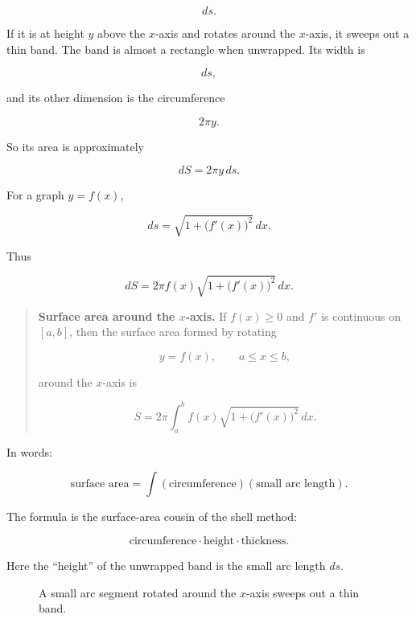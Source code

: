\[
ds.
\]

If it is at height \(y\) above the \(x\)-axis and rotates around the \(x\)-axis, it sweeps
out a thin band.  The band is almost a rectangle when unwrapped.  Its width is

\[
ds,
\]

and its other dimension is the circumference

\[
2\pi y.
\]

So its area is approximately

\[
dS=2\pi y\,ds.
\]

For a graph \(y=f(x)\),

\[
ds=\sqrt{1+\bigl(f'(x)\bigr)^2}\,dx.
\]

Thus

\[
dS
=
2\pi f(x)\sqrt{1+\bigl(f'(x)\bigr)^2}\,dx.
\]

\begin{quote}
\textbf{Surface area around the \(x\)-axis.}
If \(f(x)\ge0\) and \(f'\) is continuous on \([a,b]\), then the surface area formed by
rotating

\[
y=f(x),
\qquad a\le x\le b,
\]

around the \(x\)-axis is

\[
\boxed{
S=2\pi\int_a^b f(x)\sqrt{1+\bigl(f'(x)\bigr)^2}\,dx.
}
\]
\end{quote}

In words:

\[
\boxed{
\text{surface area}
=
\int(\text{circumference})(\text{small arc length}).
}
\]

The formula is the surface-area cousin of the shell method:

\[
\text{circumference}\cdot\text{height}\cdot\text{thickness}.
\]

Here the ``height'' of the unwrapped band is the small arc length \(ds\).

\begin{figure}[h]
\centering
{}
\caption{A small arc segment rotated around the \(x\)-axis sweeps out a thin band.}
\label{fig:surface-area-band}
\end{figure}

